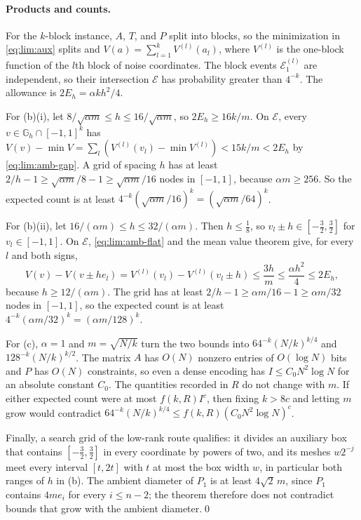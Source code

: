 \paragraph{Products and counts.}
For the $k$-block instance, $A$, $T$, and $P$ split into blocks, so the
minimization in \eqref{eq:lim:aux} splits and
$V(a)=\sum_{l=1}^kV^{(l)}(a_l)$, where $V^{(l)}$ is the one-block
function of the $l$th block of noise coordinates. The block events
$\mathcal E_1^{(l)}$ are independent, so their intersection
$\mathcal E$ has probability greater than $4^{-k}$. The allowance is
$2E_h=\alpha kh^2/4$.

For (b)(i), let $8/\sqrt{\alpha m}\le h\le16/\sqrt{\alpha m}$, so
$2E_h\ge16k/m$. On $\mathcal E$, every $v\in\mathbb G_h\cap[-1,1]^k$ has
$V(v)-\min V=\sum_l(V^{(l)}(v_l)-\min V^{(l)})<15k/m<2E_h$ by
\eqref{eq:lim:amb-gap}. A grid of spacing $h$ has at least
$2/h-1\ge\sqrt{\alpha m}/8-1\ge\sqrt{\alpha m}/16$ nodes in $[-1,1]$, because
$\alpha m\ge256$. So the expected count is at least
$4^{-k}(\sqrt{\alpha m}/16)^k=(\sqrt{\alpha m}/64)^k$.

For (b)(ii), let $16/(\alpha m)\le h\le32/(\alpha m)$. Then $h\le\frac18$, so
$v_l\pm h\in[-\frac32,\frac32]$ for $v_l\in[-1,1]$. On $\mathcal E$,
\eqref{eq:lim:amb-flat} and the mean value theorem give, for every $l$ and
both signs,
\[
 V(v)-V(v\pm he_l)=V^{(l)}(v_l)-V^{(l)}(v_l\pm h)
 \le\frac{3h}m\le\frac{\alpha h^2}4\le2E_h ,
\]
because $h\ge12/(\alpha m)$. The grid has at least
$2/h-1\ge\alpha m/16-1\ge\alpha m/32$ nodes in $[-1,1]$, so the expected count
is at least $4^{-k}(\alpha m/32)^k=(\alpha m/128)^k$.

For (c), $\alpha=1$ and $m=\sqrt{N/k}$ turn the two bounds into
$64^{-k}(N/k)^{k/4}$ and $128^{-k}(N/k)^{k/2}$. The matrix $A$ has $O(N)$
nonzero entries of $O(\log N)$ bits and $P$ has $O(N)$ constraints, so even
a dense encoding has $I\le C_0N^2\log N$ for an absolute constant $C_0$. The
quantities recorded in $R$ do not change with $m$. If either expected count
were at most $f(k,R)I^c$, then fixing $k>8c$ and letting $m$ grow would
contradict $64^{-k}(N/k)^{k/4}\le f(k,R)(C_0N^2\log N)^c$.

Finally, a search grid of the low-rank route qualifies: it divides an
auxiliary box that contains $[-\frac32,\frac32]$ in every coordinate by
powers of two, and its meshes $w2^{-j}$ meet every interval $[t,2t]$ with
$t$ at most the box width $w$, in particular both ranges of $h$ in (b). The
ambient diameter of $P_1$ is at least $4\sqrt2\,m$, since $P_1$ contains
$4me_i$ for every $i\le n-2$; the theorem therefore does not contradict
bounds that grow with the ambient diameter.\qed


